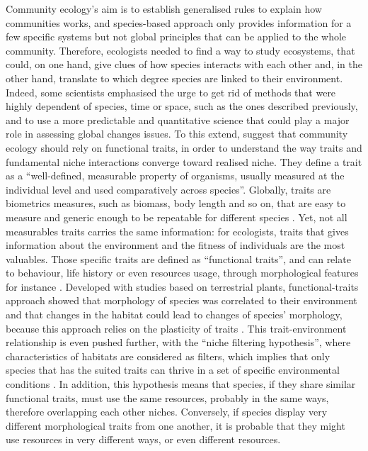 \documentclass[a4paper, 12pt]{article}
\begin{document}
Community ecology’s aim is to establish generalised rules to explain how communities works, and species-based approach only provides information for a few specific systems but not global principles that can be applied to the whole community. Therefore, ecologists needed to find a way to study ecosystems, that could, on one hand, give clues of how species interacts with each other and, in the other hand, translate to which degree species are linked to their environment. Indeed, some scientists emphasised the urge to get rid of methods that were highly dependent of species, time or space, such as the ones described previously, and to use a more predictable and quantitative science that could play a major role in assessing global changes issues. To this extend, \citep{mcgill2006} suggest that community ecology should rely on functional traits, in order to understand the way traits and fundamental niche interactions converge toward realised niche. They define a trait as a “well-defined, measurable property of organisms, usually measured at the individual level and used comparatively across species”. Globally, traits are biometrics measures, such as biomass, body length and so on, that are easy to measure and generic enough to be repeatable for different species \citep{kremer2017}. Yet, not all measurables traits carries the same information: for ecologists, traits that gives information about the environment and the fitness of individuals are the most valuables. Those specific traits are defined as “functional traits”, and can relate to behaviour, life history or even resources usage, through morphological features for instance \citep{mcgill2006}. Developed with studies based on terrestrial plants, functional-traits approach showed that morphology of species was correlated to their environment and that changes in the habitat could lead to changes of species’ morphology, because this approach relies on the plasticity of traits \citep{martini2020}. This trait-environment relationship is even pushed further, with the “niche filtering hypothesis”, where characteristics of habitats are considered as filters, which implies that only species that has the suited traits can thrive in a set of specific environmental conditions \citep{brindamour2011}. In addition, this hypothesis means that species, if they share similar functional traits, must use the same resources, probably in the same ways, therefore overlapping each other niches. Conversely, if species display very different morphological traits from one another, it is probable that they might use resources in very different ways, or even different resources. \\
\end{document}
